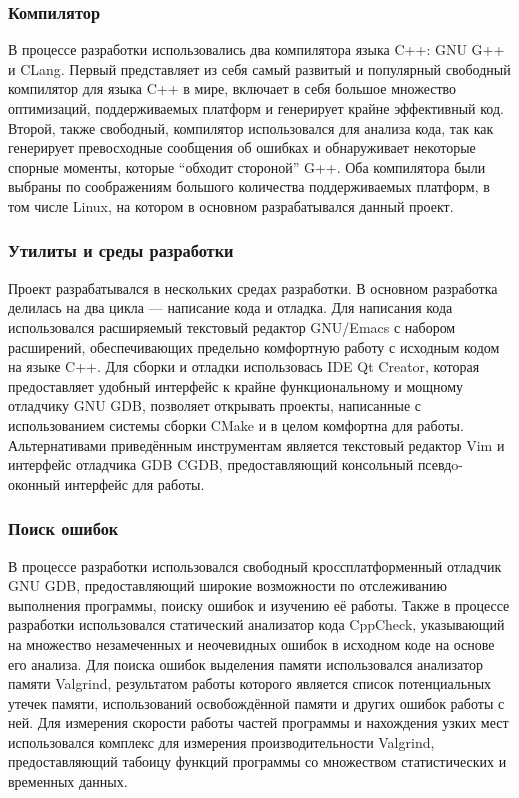 \documentclass[a4paper,12pt]{report}
\numberwithin{equation}{section}
\begin{document}
\subsubsection{Компилятор}
В процессе разработки использовались два компилятора языка C++: GNU G++ и
CLang. Первый представляет из себя самый развитый и популярный свободный
компилятор для языка C++ в мире, включает в себя большое множество оптимизаций,
поддерживаемых платформ и генерирует крайне эффективный код. Второй, также
свободный, компилятор использовался для анализа кода, так как генерирует
превосходные сообщения об ошибках и обнаруживает некоторые спорные моменты,
которые ``обходит стороной'' G++. Оба компилятора были выбраны по соображениям
большого количества поддерживаемых платформ, в том числе Linux, на котором в
основном разрабатывался данный проект.

\subsubsection{Утилиты и среды разработки}
Проект разрабатывался в нескольких средах разработки. В основном разработка
делилась на два цикла --- написание кода и отладка. Для написания кода
использовался расширяемый текстовый редактор GNU/Emacs с набором расширений, обеспечивающих
предельно комфортную работу с исходным кодом на языке C++. Для сборки и отладки
использовась IDE Qt Creator, которая предоставляет удобный интерфейс к крайне
функциональному и мощному отладчику GNU GDB, позволяет открывать проекты,
написанные с использованием системы сборки CMake и в целом комфортна для
работы. Альтернативами приведённым инструментам является текстовый редактор
Vim и интерфейс отладчика GDB CGDB, предоставляющий консольный
псевдo-оконный интерфейс для работы.

\subsubsection{Поиск ошибок}
В процессе разработки использовался свободный кроссплатформенный отладчик GNU
GDB, предоставляющий широкие возможности по отслеживанию выполнения программы,
поиску ошибок и изучению её работы. Также в процессе разработки использовался
статический анализатор кода CppCheck, указывающий на множество незамеченных и
неочевидных ошибок в исходном коде на основе его анализа. Для поиска ошибок
выделения памяти использовался анализатор памяти Valgrind, результатом работы
которого является список потенциальных утечек памяти, использований
освобождённой памяти и других ошибок работы с ней. Для измерения скорости работы
частей программы и нахождения узких мест использовался комплекс для измерения
производительности Valgrind, предоставляющий табоицу функций программы со
множеством статистических и временных данных.
\end{document}
